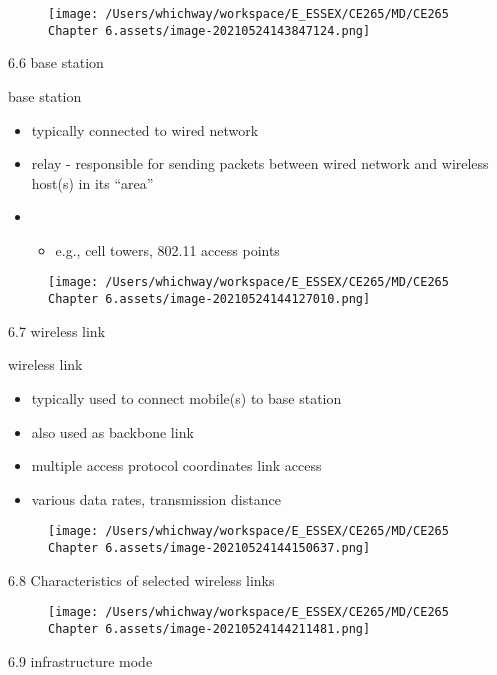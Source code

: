 \documentclass[
]{article}
\begin{document}
\begin{figure}
\centering
\texttt{[image: /Users/whichway/workspace/E\_ESSEX/CE265/MD/CE265 Chapter 6.assets/image-20210524143847124.png]}
\caption{}
\end{figure}

6.6 base station

base station

\begin{itemize}
\item
  typically connected to wired network
\item
  relay - responsible for sending packets between wired network and
  wireless host(s) in its ``area''
\item
  \begin{itemize}
  \item
    e.g., cell towers, 802.11 access points
  \end{itemize}
\end{itemize}

\begin{figure}
\centering
\texttt{[image: /Users/whichway/workspace/E\_ESSEX/CE265/MD/CE265 Chapter 6.assets/image-20210524144127010.png]}
\caption{}
\end{figure}

6.7 wireless link

wireless link

\begin{itemize}
\item
  typically used to connect mobile(s) to base station
\item
  also used as backbone link
\item
  multiple access protocol coordinates link access
\item
  various data rates, transmission distance
\end{itemize}

\begin{figure}
\centering
\texttt{[image: /Users/whichway/workspace/E\_ESSEX/CE265/MD/CE265 Chapter 6.assets/image-20210524144150637.png]}
\caption{}
\end{figure}

6.8 Characteristics of selected wireless links

\begin{figure}
\centering
\texttt{[image: /Users/whichway/workspace/E\_ESSEX/CE265/MD/CE265 Chapter 6.assets/image-20210524144211481.png]}
\caption{}
\end{figure}

6.9 infrastructure mode
\end{document}
